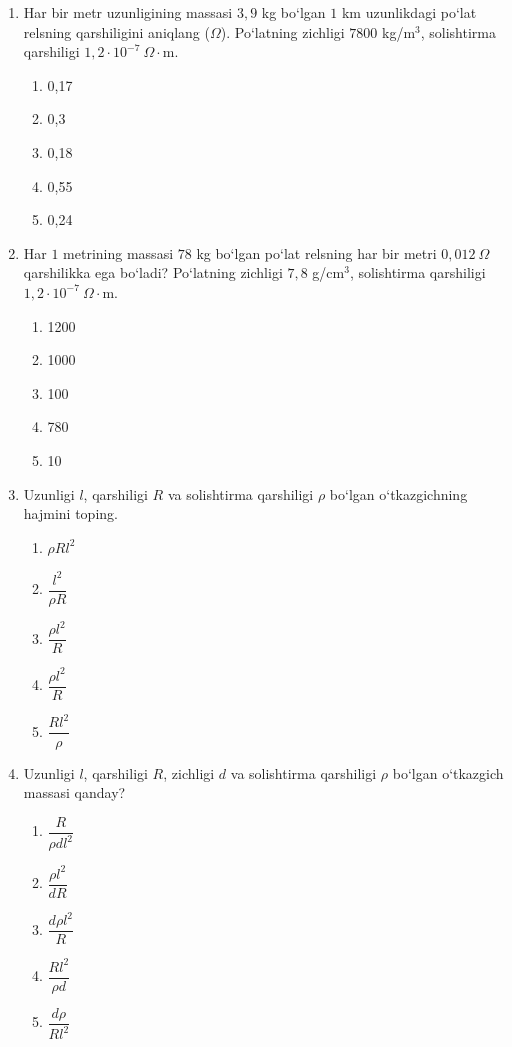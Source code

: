 \begin{enumerate}
\item Har bir metr uzunligining massasi $3,9$ kg bo‘lgan $1$ km uzunlikdagi po‘lat relsning qarshiligini aniqlang ($\Omega$). Po‘latning zichligi $7800$ kg/m$^3$, solishtirma qarshiligi $1,2\cdot10^{-7}~\Omega\cdot$m.
\begin{enumerate}[label=\Alph*)]
\item 0,17
\item 0,3
\item 0,18
\item 0,55
\item 0,24
\end{enumerate}

\item Har $1$ metrining massasi $78$ kg bo‘lgan po‘lat relsning har bir metri $0,012~\Omega$ qarshilikka ega bo‘ladi? Po‘latning zichligi $7,8$ g/cm$^3$, solishtirma qarshiligi $1,2\cdot10^{-7}~\Omega\cdot$m.
\begin{enumerate}[label=\Alph*)]
\item 1200
\item 1000
\item 100
\item 780
\item 10
\end{enumerate}

\item Uzunligi $l$, qarshiligi $R$ va solishtirma qarshiligi $\rho$ bo‘lgan o‘tkazgichning hajmini toping.
\begin{enumerate}[label=\Alph*)]
\item $\rho R l^2$
\item $\dfrac{l^2}{\rho R}$
\item $\dfrac{\rho l^2}{R}$
\item $\dfrac{\rho l^2}{R}$
\item $\dfrac{Rl^2}{\rho}$
\end{enumerate}

\item Uzunligi $l$, qarshiligi $R$, zichligi $d$ va solishtirma qarshiligi $\rho$ bo‘lgan o‘tkazgich massasi qanday?
\begin{enumerate}[label=\Alph*)]
\item $\dfrac{R}{\rho d l^2}$
\item $\dfrac{\rho l^2}{dR}$
\item $\dfrac{d\rho l^2}{R}$
\item $\dfrac{Rl^2}{\rho d}$
\item $\dfrac{d\rho}{Rl^2}$
\end{enumerate}


\end{enumerate}
